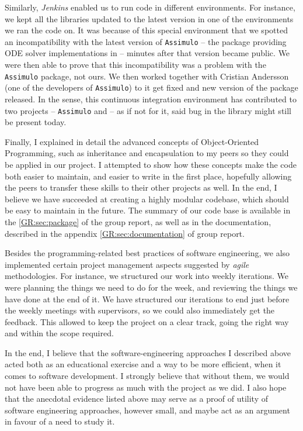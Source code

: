 Similarly, \emph{Jenkins} enabled us to run code in different environments. For instance, we kept all the libraries updated to the latest version in one of the environments we ran the code on. 
It was because of this special environment that we spotted an incompatibility with the latest version of \verb"Assimulo"\cite{andersson_christian_assimulo:_????} -- the package providing ODE solver implementations in \py{} -- minutes after that version became public. We were then able to prove that this incompatibility was a problem with the \verb"Assimulo" package, not ours. 
We then worked together with Cristian Andersson (one of the developers of \verb"Assimulo") to it get fixed and new version of the package released.
In the sense, this continuous integration environment has contributed to two projects -- \verb"Assimulo" and \means{} -- as if not for it, said bug in the library might still be present today.

Finally, I explained in detail the advanced concepts of Object-Oriented Programming, such as inheritance and encapsulation to my peers so they could be applied in our project.
I attempted to show how these concepts make the code both easier to maintain, and easier to write in the first place, hopefully allowing the peers to transfer these skills to their other projects as well.
In the end, I believe we have succeeded at creating a highly modular codebase, which should be easy to maintain in the future. The summary of our code base is available in the \autoref*{GR:sec:package} of the group report, as well as in the documentation, described in the appendix \autoref*{GR:sec:documentation} of group report.

Besides the programming-related best practices of software engineering, we also implemented certain project management aspects suggested by \emph{agile} methodologies. 
For instance, we structured our work into weekly iterations. We were planning the things we need to do for the week, and reviewing the things we have done at the end of it. 
We have structured our iterations to end just before the weekly meetings with supervisors, so we could also immediately get the feedback.
This allowed to keep the project on a clear track, going the right way and within the scope required.

In the end, I believe that the software-engineering approaches I described above acted both as an educational exercise and a way to be more efficient, when it comes to software development.
I strongly believe that without them, we would not have been able to progress as much with the project as we did.
I also hope that the anecdotal evidence listed above may serve as a proof of utility of software engineering approaches, however small, and maybe act as an argument in favour of a need to study it.

